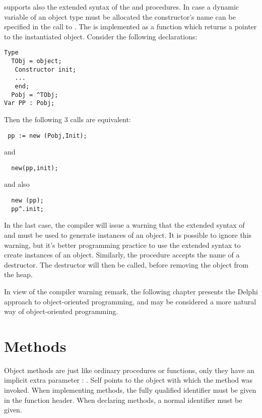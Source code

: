 \fpc supports also the extended syntax of the  and 
procedures. In case a dynamic variable of an object type must be allocated
the constructor's name can be specified in the call to .
The  is implemented as a function which returns a pointer to the
instantiated object. Consider the following declarations:
\begin{verbatim}
Type
  TObj = object;
   Constructor init;
   ...
   end;
  Pobj = ^TObj;
Var PP : Pobj;
\end{verbatim}
Then the following 3 calls are equivalent:
\begin{verbatim}
 pp := new (Pobj,Init);
\end{verbatim}
and
\begin{verbatim}
  new(pp,init);
\end{verbatim}
and also
\begin{verbatim}
  new (pp);
  pp^.init;
\end{verbatim}
In the last case, the compiler will issue a warning that the
extended syntax of  and  must be used to generate instances of an
object. It is possible to ignore this warning, but it's better programming practice to
use the extended syntax to create instances of an object.
Similarly, the  procedure accepts the name of a destructor. The
destructor will then be called, before removing the object from the heap.

In view of the compiler warning remark, the following chapter presents the
Delphi approach to object-oriented programming, and may be considered a
more natural way of object-oriented programming.

\section{Methods}
Object methods are just like ordinary procedures or functions, only they
have an implicit extra parameter : . Self points to the object
with which the method was invoked.
When implementing methods, the fully qualified identifier must be given
in the function header. When declaring methods, a normal identifier must be
given.

